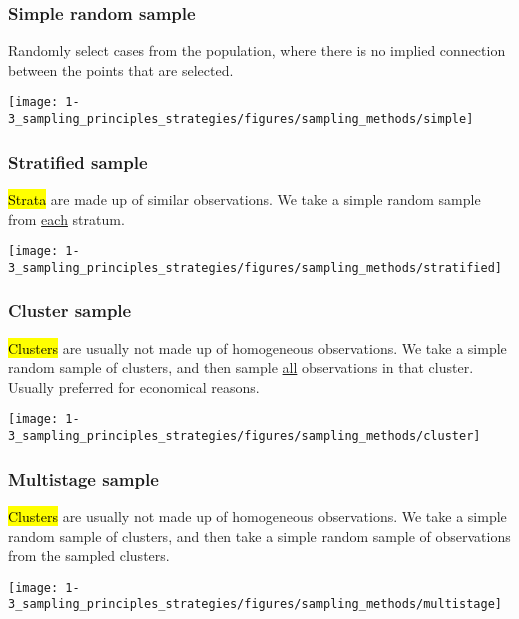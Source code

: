 
\begin{frame}
\frametitle{Simple random sample}

Randomly select cases from the population, where there is no implied connection between the points that are selected.

\begin{center}
\texttt{[image: 1-3\_sampling\_principles\_strategies/figures/sampling\_methods/simple]}
\end{center}

\end{frame}


\begin{frame}
\frametitle{Stratified sample}

\hl{Strata} are made up of similar observations. We take a simple random sample from \underline{each} stratum.

\begin{center}
\texttt{[image: 1-3\_sampling\_principles\_strategies/figures/sampling\_methods/stratified]}
\end{center}

\end{frame}


\begin{frame}
\frametitle{Cluster sample}

\hl{Clusters} are usually not made up of homogeneous observations. We take a simple random sample of clusters, and then sample \underline{all} observations in that cluster. Usually preferred for economical reasons.

\begin{center}
\texttt{[image: 1-3\_sampling\_principles\_strategies/figures/sampling\_methods/cluster]}
\end{center}

\end{frame}


\begin{frame}
\frametitle{Multistage sample}

\hl{Clusters} are usually not made up of homogeneous observations.  We take a simple random sample of clusters, and then take a simple random sample of observations from the sampled clusters.

\begin{center}
\texttt{[image: 1-3\_sampling\_principles\_strategies/figures/sampling\_methods/multistage]}
\end{center}

\end{frame}

